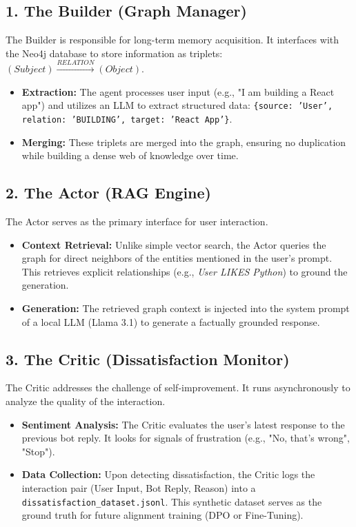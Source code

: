 \documentclass[a4paper,12pt]{article}
\begin{document}
\subsection{1. The Builder (Graph Manager)}
The Builder is responsible for long-term memory acquisition. It interfaces with the Neo4j database to store information as triplets: $(Subject) \xrightarrow{RELATION} (Object)$.
\begin{itemize}
    \item \textbf{Extraction:} The agent processes user input (e.g., "I am building a React app") and utilizes an LLM to extract structured data: \texttt{\{source: 'User', relation: 'BUILDING', target: 'React App'\}}.
    \item \textbf{Merging:} These triplets are merged into the graph, ensuring no duplication while building a dense web of knowledge over time.
\end{itemize}

\subsection{2. The Actor (RAG Engine)}
The Actor serves as the primary interface for user interaction.
\begin{itemize}
    \item \textbf{Context Retrieval:} Unlike simple vector search, the Actor queries the graph for direct neighbors of the entities mentioned in the user's prompt. This retrieves explicit relationships (e.g., \textit{User LIKES Python}) to ground the generation.
    \item \textbf{Generation:} The retrieved graph context is injected into the system prompt of a local LLM (Llama 3.1) to generate a factually grounded response.
\end{itemize}

\subsection{3. The Critic (Dissatisfaction Monitor)}
The Critic addresses the challenge of self-improvement. It runs asynchronously to analyze the quality of the interaction.
\begin{itemize}
    \item \textbf{Sentiment Analysis:} The Critic evaluates the user's latest response to the previous bot reply. It looks for signals of frustration (e.g., "No, that's wrong", "Stop").
    \item \textbf{Data Collection:} Upon detecting dissatisfaction, the Critic logs the interaction pair (User Input, Bot Reply, Reason) into a \texttt{dissatisfaction\_dataset.jsonl}. This synthetic dataset serves as the ground truth for future alignment training (DPO or Fine-Tuning).
\end{itemize}
\end{document}
